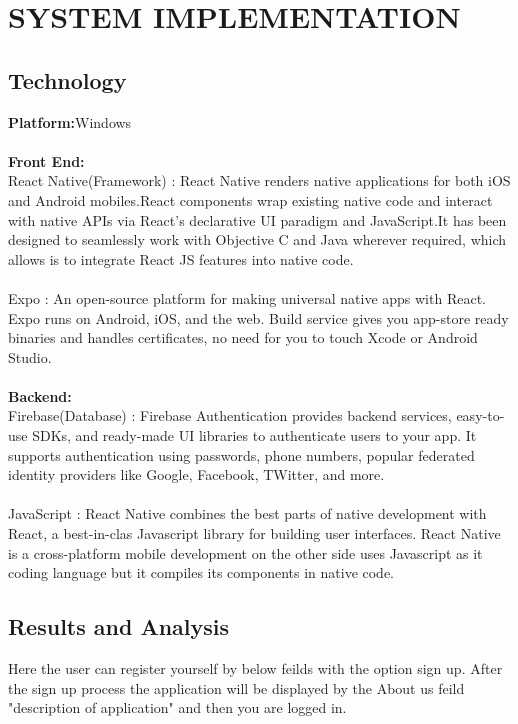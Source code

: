 \documentclass[12pt,a4paper]{report}
\begin{document}
\chapterfont{}
\setcounter{secnumdepth}{4}
\chapter {SYSTEM IMPLEMENTATION}
\section{Technology}
\textbf{Platform:}Windows\\
\\
\textbf{Front End:}\\
React Native(Framework) : React Native renders native applications for both iOS and Android mobiles.React components wrap existing native code and interact with native APIs via React’s declarative UI paradigm and JavaScript.It has been designed to seamlessly work with Objective C and Java wherever required, which allows is to integrate React JS features into native code. \\\\
Expo : An open-source platform for making universal native apps with React. Expo runs on Android, iOS, and the web. Build service gives you app-store ready binaries and handles certificates, no need for you to touch Xcode or Android Studio.\\\\          
\textbf{Backend:}\\
Firebase(Database) : Firebase Authentication provides backend services, easy-to-use SDKs, and ready-made UI libraries to authenticate users to your app. It supports authentication using passwords, phone numbers, popular federated identity providers like Google, Facebook, TWitter, and more.\\\\
JavaScript : React Native combines the best parts of native development with React, a best-in-clas Javascript library for building user interfaces. React Native is a cross-platform mobile development on the other side uses Javascript as it coding language but it compiles its components in native code.

\section{Results and Analysis}

\begin{figure}[h]
\end{figure}
Here the user can register yourself by below feilds with the option sign up. After the sign up process the application will be displayed by the About us feild "description of application" and then you are logged in.
\end{document}
